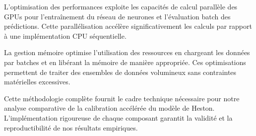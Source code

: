 L'optimisation des performances exploite les capacités de calcul parallèle des GPUs pour l'entraînement du réseau de neurones et l'évaluation batch des prédictions. Cette parallélisation accélère significativement les calculs par rapport à une implémentation CPU séquentielle.

La gestion mémoire optimise l'utilisation des ressources en chargeant les données par batches et en libérant la mémoire de manière appropriée. Ces optimisations permettent de traiter des ensembles de données volumineux sans contraintes matérielles excessives.

Cette méthodologie complète fournit le cadre technique nécessaire pour notre analyse comparative de la calibration accélérée du modèle de Heston. L'implémentation rigoureuse de chaque composant garantit la validité et la reproductibilité de nos résultats empiriques.
